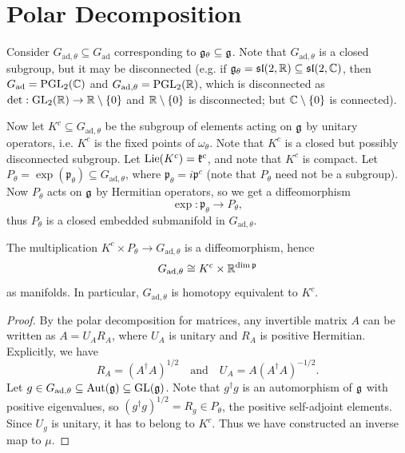 \section{Polar Decomposition}
\begin{remark}
  Consider $G_{\mathrm{ad}, \theta} \subseteq G_{\mathrm{ad}}$
  corresponding to $\mathfrak{g}_\theta \subseteq \mathfrak{g}$.
  Note that $G_{\mathrm{ad}, \theta}$
  is a closed subgroup, but it may be
  disconnected (e.g. if $\mathfrak{g}_\theta = \mathfrak{sl}(2, \mathbb{R}) \subseteq \mathfrak{sl}(2, \mathbb{C})$, then
  $G_{\mathrm{ad}} = \mathrm{PGL}_2(\mathbb{C})$ and
  $G_{\mathrm{ad}, \theta} = \mathrm{PGL}_2(\mathbb{R})$, which is disconnected as
  $\det : \operatorname{GL}_2(\mathbb{R}) \to \mathbb{R} \setminus \{0\}$
  and $\mathbb{R} \setminus \{0\}$ is disconnected;
  but $\mathbb{C} \setminus \{0\}$ is connected).

  \pagebreak

  Now let $K^c \subseteq G_{\mathrm{ad}, \theta}$
  be the subgroup of elements acting
  on $\mathfrak{g}$ by unitary operators, i.e.
  $K^c$ is the fixed points of
  $\omega_\theta$. Note that $K^c$ is a
  closed but possibly disconnected subgroup.
  Let $\operatorname{Lie}(K^c) = \mathfrak{k}^c$, and
  note that $K^c$ is compact.
  Let $P_\theta = \exp(\mathfrak{p}_\theta) \subseteq G_{\mathrm{ad}, \theta}$,
  where $\mathfrak{p}_\theta = i\mathfrak{p}^c$ (note that
  $P_\theta$ need not be a subgroup).
  Now $P_\theta$ acts on $\mathfrak{g}$ by Hermitian
  operators, so we get a diffeomorphism
  \[
    \exp : \mathfrak{p}_\theta \to P_\theta,
  \]
  thus $P_\theta$ is a closed embedded
  submanifold in $G_{\mathrm{ad}, \theta}$.
\end{remark}

\begin{theorem}
  The multiplication
  $K^c \times P_\theta \to G_{\mathrm{ad}, \theta}$ is a diffeomorphism,
  hence
  \[
    G_{\mathrm{ad}, \theta}
    \cong K^c \times \mathbb{R}^{\dim \mathfrak{p}}
  \]
  as manifolds. In particular,
  $G_{\mathrm{ad}, \theta}$ is
  homotopy equivalent to $K^c$.
\end{theorem}

\begin{proof}
  By the polar decomposition for
  matrices,
  any invertible matrix $A$ can be written
  as $A = U_A R_A$, where
  $U_A$ is unitary and $R_A$ is
  positive Hermitian. Explicitly, we have
  \[
    R_A = (A^\dagger A)^{1/2}
    \quad \text{and} \quad
    U_A = A (A^\dagger A)^{-1/2}.
  \]
  Let $g \in G_{\mathrm{ad}, \theta} \subseteq \operatorname{Aut}(\mathfrak{g}) \subseteq \operatorname{GL}(\mathfrak{g})$.
  Note that $g^\dagger g$ is an
  automorphism of $\mathfrak{g}$ with positive
  eigenvalues, so
  $(g^\dagger g)^{1 / 2} = R_g \in P_\theta$,
  the positive self-adjoint elements.
  Since $U_g$ is unitary, it has to
  belong to $K^c$. Thus we have constructed
  an inverse map to $\mu$.
\end{proof}

